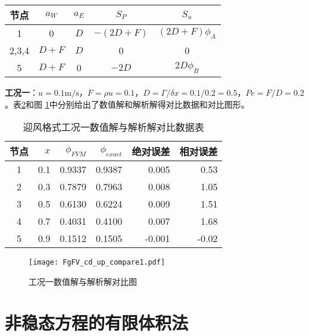 \begin{table}[H]
  \begin{center}
  \label{TbFV_up_ex1_coefficient}
  \begin{tabular}{|c|c|c|c|c|}
    \hline
    节点 & $a_{W}$ & $a_{E}$ & $S_{P}$ & $S_{u}$
    \\
    \hline
    1 & 0 & $D$ & $-(2D+F)$ & $(2D+F)\phi_{A}$ \\
    \hline
    2,3,4 & $D+F$ & $D$ & 0 & 0 \\
    \hline
    5 & $D+F$ & 0 & $-2D$ & $2D\phi_{B}$ \\
    \hline
  \end{tabular}
  \end{center}
\end{table}

\textbf{工况一}：$u=0.1\mathrm{m/s}$，$F=\rho u=0.1$，$D=\Gamma/\delta
x=0.1/0.2=0.5$，$Pe=F/D=0.2$。表\ref{TbFV_up_ex1_result}和图
\ref{FgFV_up_ex1_compare}中分别给出了数值解和解析解得对比数据和对比图形。
\begin{table}[H]
  \begin{center}
    \caption{迎风格式工况一数值解与解析解对比数据表}
  \label{TbFV_up_ex1_result}
  \begin{tabular}{|c|r|r|r|r|r|}
    \hline
    节点 & $x$ & $\phi_{FVM}$ & $\phi_{exact}$ & 绝对误差 & 相对误差\\
    \hline
    1 & 0.1 & 0.9337 & 0.9387 & 0.005 & 0.53
    \\
    \hline
    2 & 0.3 & 0.7879 & 0.7963 & 0.008 & 1.05
    \\
    \hline
    3 & 0.5 & 0.6130 & 0.6224 & 0.009 & 1.51
    \\
    \hline
    4 & 0.7 & 0.4031 & 0.4100 & 0.007 & 1.68
    \\
    \hline
    5 & 0.9 & 0.1512 & 0.1505 & -0.001 & -0.02
    \\
    \hline
  \end{tabular}
  \end{center}
\end{table}

\begin{figure}[h]
  \centering
  \texttt{[image: FgFV\_cd\_up\_compare1.pdf]}
  \caption{工况一数值解与解析解对比图}
  \label{FgFV_up_ex1_compare}
\end{figure}
\section{非稳态方程的有限体积法}


